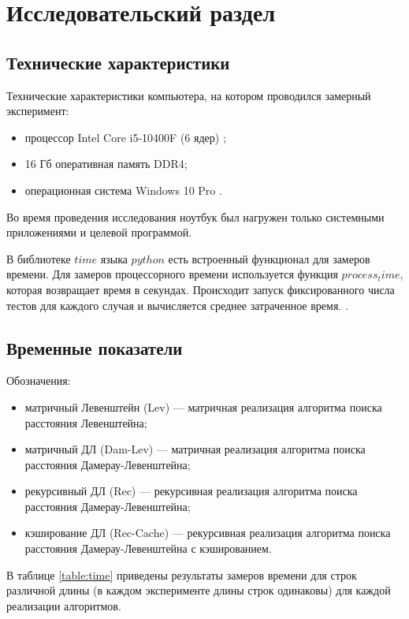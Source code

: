 \chapter{Исследовательский раздел}

\section{Технические характеристики}

Технические характеристики компьютера, на котором проводился замерный эксперимент:
\begin{itemize}
	\item процессор Intel Core i5-10400F (6 ядер) \cite{intel};
	\item 16 Гб оперативная память DDR4;
	\item операционная система Windows 10 Pro \cite{windows}.
\end{itemize}

Во время проведения исследования ноутбук был нагружен только системными приложениями и целевой программой. 

В библиотеке $time$ языка $python$ есть встроенный функционал для замеров времени.
Для замеров процессорного времени используется функция $process_time$, которая возвращает время в секундах.
Происходит запуск фиксированного числа тестов для каждого случая и вычисляется среднее затраченное время. \cite{python-time}.

\section{Временные показатели}

Обозначения:
\begin{itemize}
	\item матричный Левенштейн (Lev) --- матричная реализация алгоритма поиска расстояния Левенштейна;
	\item матричный ДЛ (Dam-Lev) --- матричная реализация алгоритма поиска расстояния Дамерау-Левенштейна;
	\item рекурсивный ДЛ (Rec) --- рекурсивная реализация алгоритма поиска расстояния Дамерау-Левенштейна;
	\item кэширование ДЛ (Rec-Cache) --- рекурсивная реализация алгоритма поиска расстояния Дамерау-Левенштейна с кэшированием.
\end{itemize}

В таблице \ref{table:time} приведены результаты замеров времени для строк различной длины (в каждом эксперименте длины строк одинаковы) для каждой реализации алгоритмов.

